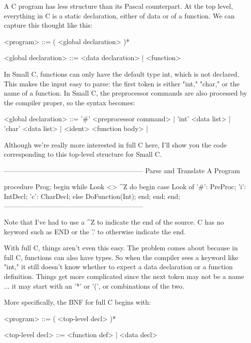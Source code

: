 \documentclass[float=false, crop=false]{standalone}
\begin{document}
A C program has less structure than its Pascal counterpart. At the top level,
everything in C is a static declaration, either of data or of a function. We can
capture this thought like this:


     <program> ::= ( <global declaration> )*

     <global declaration> ::= <data declaration>  |
                              <function>

In Small C, functions can only have the default type int, which is not declared.
This makes the input easy to parse: the first token is either "int," "char," or
the name of a function. In Small C, the preprocessor commands are also processed
by the compiler proper, so the syntax becomes:


     <global declaration> ::= '#' <preprocessor command>  |
                              'int' <data list>           |
                              'char' <data list>          |
                              <ident> <function body>     |


Although we're really more interested in full C here, I'll show you the code
corresponding to this top-level structure for Small C.

\begin{code}
{--------------------------------------------------------------}
{ Parse and Translate A Program }

procedure Prog;
begin
   while Look <> ^Z do begin
      case Look of
       '#': PreProc;
       'i': IntDecl;
       'c': CharDecl;
      else DoFunction(Int);
      end;
   end;
end;
{--------------------------------------------------------------}
\end{code}

Note that I've had to use a ^Z to indicate the end of the source. C has no
keyword such as END or the '.' to otherwise indicate the end.

With full C, things aren't even this easy. The problem comes about because in
full C, functions can also have types. So when the compiler sees a keyword like
"int," it still doesn't know whether to expect a data declaration or a function
definition. Things get more complicated since the next token may not be a name
... it may start with an '*' or '(', or combinations of the two.

More specifically, the BNF for full C begins with:


     <program> ::= ( <top-level decl> )*

     <top-level decl> ::= <function def> | <data decl>
\end{document}
